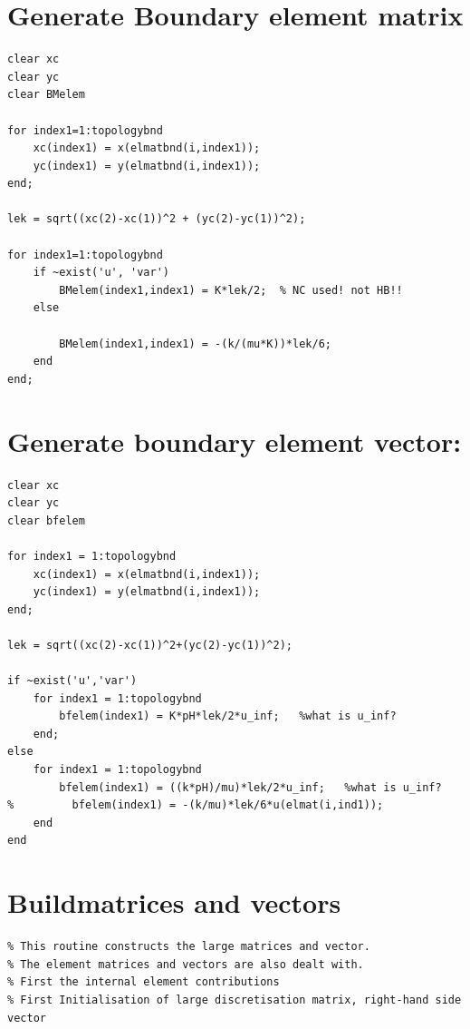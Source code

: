 \documentclass[a4paper]{report}
\begin{document}
\begin{appendices}
\begin{lstlisting}
\end{lstlisting}



\newpage

\section{Generate Boundary element matrix}

\begin{lstlisting}
clear xc
clear yc
clear BMelem

for index1=1:topologybnd
	xc(index1) = x(elmatbnd(i,index1));
	yc(index1) = y(elmatbnd(i,index1));
end;

lek = sqrt((xc(2)-xc(1))^2 + (yc(2)-yc(1))^2);

for index1=1:topologybnd
	if ~exist('u', 'var')
		BMelem(index1,index1) = K*lek/2;  % NC used! not HB!!
	else

		BMelem(index1,index1) = -(k/(mu*K))*lek/6;
	end
end;
\end{lstlisting}



\section{Generate boundary element vector:}

\begin{lstlisting}
clear xc
clear yc
clear bfelem

for index1 = 1:topologybnd
	xc(index1) = x(elmatbnd(i,index1));
	yc(index1) = y(elmatbnd(i,index1));
end;

lek = sqrt((xc(2)-xc(1))^2+(yc(2)-yc(1))^2);

if ~exist('u','var')
	for index1 = 1:topologybnd
		bfelem(index1) = K*pH*lek/2*u_inf;   %what is u_inf?
	end;
else
	for index1 = 1:topologybnd
		bfelem(index1) = ((k*pH)/mu)*lek/2*u_inf;   %what is u_inf?
%         bfelem(index1) = -(k/mu)*lek/6*u(elmat(i,ind1));
	end
end
\end{lstlisting}

\section{Buildmatrices and vectors}

\begin{lstlisting}
% This routine constructs the large matrices and vector.
% The element matrices and vectors are also dealt with.
% First the internal element contributions
% First Initialisation of large discretisation matrix, right-hand side vector


\end{lstlisting}
\end{appendices}
\end{document}
